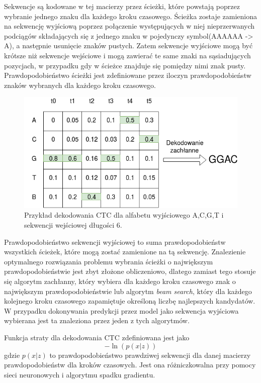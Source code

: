 \documentclass[a4paper,11pt,twoside]{report}
\theoremstyle{definition}
\begin{document}
Sekwencje są kodowane w tej macierzy przez ścieżki, które powstają poprzez wybranie jednego znaku dla każdego kroku czasowego. Ścieżka zostaje zamieniona na sekwencję wyjściową poprzez połączenie występujących w niej nieprzerwanych podciągów składających się z jednego znaku w pojedynczy symbol(AAAAAA -> A), a następnie usunięcie znaków pustych. Zatem sekwencje wyjściowe mogą być krótsze niż sekwencje wejściowe i mogą zawierać te same znaki na sąsiadujących pozycjach, w przypadku gdy w ścieżce znajduje się pomiędzy nimi znak pusty. Prawdopodobieństwo ścieżki jest zdefiniowane przez iloczyn prawdopodobieństw znaków wybranych dla każdego kroku czasowego.

\begin{figure}[h!]
	\centering
	\includegraphics[scale=0.8]{ctc_array}
	\caption{Przykład dekodowania CTC dla alfabetu wyjściowego {A,C,G,T} i sekwencji wejściowej długości 6.}
\end{figure}

Prawdopodobieństwo sekwencji wyjściowej to suma prawdopodobieństw wszystkich ścieżek, które mogą zostać zamienione na tą sekwencję. Znalezienie optymalnego rozwiązania problemu wybrania ścieżki o największym prawdopodobieństwie jest zbyt złożone obliczeniowo, dlatego zamiast tego stosuje się algorytm zachłanny, który wybiera dla każdego kroku czasowego znak o największym prawdopodobieństwie lub algorytm \textit{beam search}, który dla każdego kolejnego kroku czasowego zapamiętuje określoną liczbę najlepszych kandydatów. W przypadku dokonywania predykcji przez model jako sekwencja wyjściowa wybierana jest ta znaleziona przez jeden z tych algorytmów.

Funkcja straty dla dekodowania CTC zdefiniowana jest jako
\[-\ln{(p(x|z))}\]
gdzie $p(x|z)$ to prawdopodobieństwo prawdziwej sekwencji dla danej macierzy prawdopodobieństw dla kroków czasowych. Jest ona różniczkowalna przy pomocy sieci neuronowych i algorytmu spadku gradientu.
\end{document}
